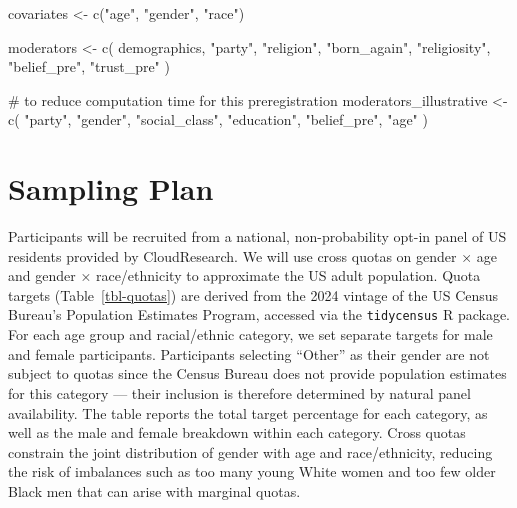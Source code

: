 \documentclass[
  letterpaper,
  DIV=11,
  numbers=noendperiod]{scrartcl}
\newenvironment{Shaded}{\begin{snugshade}}{\end{snugshade}}
\newcommand{\CommentTok}[1]{\textcolor[rgb]{0.37,0.37,0.37}{#1}}
\newcommand{\FunctionTok}[1]{\textcolor[rgb]{0.28,0.35,0.67}{#1}}
\newcommand{\NormalTok}[1]{\textcolor[rgb]{0.00,0.23,0.31}{#1}}
\newcommand{\OtherTok}[1]{\textcolor[rgb]{0.00,0.23,0.31}{#1}}
\newcommand{\StringTok}[1]{\textcolor[rgb]{0.13,0.47,0.30}{#1}}
\begin{document}
\begin{Shaded}
\begin{Highlighting}[]
\NormalTok{covariates }\OtherTok{\textless{}{-}} \FunctionTok{c}\NormalTok{(}\StringTok{"age"}\NormalTok{, }\StringTok{"gender"}\NormalTok{, }\StringTok{"race"}\NormalTok{)}

\NormalTok{moderators }\OtherTok{\textless{}{-}} \FunctionTok{c}\NormalTok{(}
\NormalTok{  demographics,}
  \StringTok{"party"}\NormalTok{,}
  \StringTok{"religion"}\NormalTok{,}
  \StringTok{"born\_again"}\NormalTok{,}
  \StringTok{"religiosity"}\NormalTok{,}
  \StringTok{"belief\_pre"}\NormalTok{,}
  \StringTok{"trust\_pre"}
\NormalTok{)}

\CommentTok{\# to reduce computation time for this preregistration}
\NormalTok{moderators\_illustrative }\OtherTok{\textless{}{-}} \FunctionTok{c}\NormalTok{(}
  \StringTok{"party"}\NormalTok{,}
  \StringTok{"gender"}\NormalTok{,}
  \StringTok{"social\_class"}\NormalTok{,}
  \StringTok{"education"}\NormalTok{,}
  \StringTok{"belief\_pre"}\NormalTok{,}
  \StringTok{"age"}
\NormalTok{)}
\end{Highlighting}
\end{Shaded}

\section{Sampling Plan}\label{sampling-plan}

Participants will be recruited from a national, non-probability opt-in
panel of US residents provided by CloudResearch. We will use cross
quotas on gender × age and gender × race/ethnicity to approximate the US
adult population. Quota targets (Table~\ref{tbl-quotas}) are derived
from the 2024 vintage of the US Census Bureau's Population Estimates
Program, accessed via the \texttt{tidycensus} R package. For each age
group and racial/ethnic category, we set separate targets for male and
female participants. Participants selecting ``Other'' as their gender
are not subject to quotas since the Census Bureau does not provide
population estimates for this category --- their inclusion is therefore
determined by natural panel availability. The table reports the total
target percentage for each category, as well as the male and female
breakdown within each category. Cross quotas constrain the joint
distribution of gender with age and race/ethnicity, reducing the risk of
imbalances such as too many young White women and too few older Black
men that can arise with marginal quotas.
\end{document}
